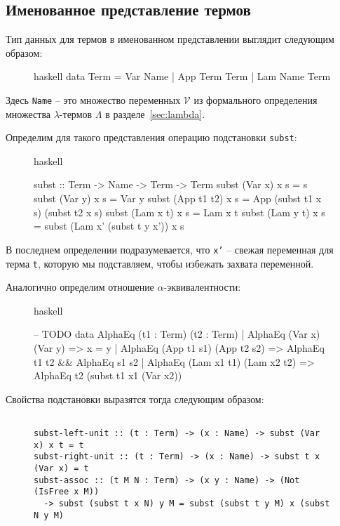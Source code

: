 \subsection{Именованное представление термов}
\label{sec:named}

Тип данных для термов в именованном представлении выглядит следующим образом:

\begin{figure}[htp]
\centering
\begin{cminted}{haskell}
data Term =
  Var Name |
  App Term Term |
  Lam Name Term
\end{cminted}
\end{figure}

Здесь \texttt{Name} -- это множество переменных $\mathcal{V}$ из формального определения множества $\lambda$-термов $\Lambda$ в разделе~\ref{sec:lambda}.

Определим для такого представления операцию подстановки \texttt{subst}:

\begin{figure}[H]
\centering
\begin{cminted}{haskell}

subst :: Term -> Name -> Term -> Term
subst (Var x) x s = s
subst (Var y) x s = Var y
subst (App t1 t2) x s = App (subst t1 x s) (subst t2 x s)
subst (Lam x t) x s = Lam x t
subst (Lam y t) x s = subst (Lam x' (subst t y x')) x s

\end{cminted}
\end{figure}

В последнем определении подразумевается, что \texttt{x'} -- свежая переменная для терма \texttt{t}, которую мы подставляем, чтобы избежать захвата переменной.

Аналогично определим отношение $\alpha$-эквивалентности:
\begin{figure}[H]
\centering
\begin{cminted}{haskell}

-- TODO
data AlphaEq (t1 : Term) (t2 : Term)
  | AlphaEq (Var x) (Var y) => x = y
  | AlphaEq (App t1 s1) (App t2 s2) => AlphaEq t1 t2 && AlphaEq s1 s2
  | AlphaEq (Lam x1 t1) (Lam x2 t2) => AlphaEq t2 (subst t1 x1 (Var x2))

\end{cminted}
\end{figure}

Свойства подстановки выразятся тогда следующим образом:
\begin{figure}[H]
\centering
\begin{verbatim}

subst-left-unit :: (t : Term) -> (x : Name) -> subst (Var x) x t = t
subst-right-unit :: (t : Term) -> (x : Name) -> subst t x (Var x) = t
subst-assoc :: (t M N : Term) -> (x y : Name) -> (Not (IsFree x M))
  -> subst (subst t x N) y M = subst (subst t y M) x (subst N y M)

\end{verbatim}
\end{figure}
